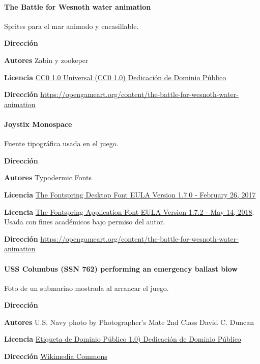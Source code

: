 \documentclass[a4paper,
	11pt,
	parskip=full,
	bibliography=totoc,
	twoside
	]{scrartcl}
\begin{document}
	\paragraph{The Battle for Wesnoth water animation}
	Sprites para el mar animado y encasillable.
	\begin{labeling}{\textbf{Dirección}}
		\item[\textbf{Autores}] Zabin y zookeper
		\item[\textbf{Licencia}] \href{https://creativecommons.org/publicdomain/zero/1.0/deed.es}{CC0 1.0 Universal (CC0 1.0)
			Dedicación de Dominio Público}
		\item[\textbf{Dirección}] \href{https://opengameart.org/content/the-battle-for-wesnoth-water-animation}{https://opengameart.org/content/the-battle-for-wesnoth-water-animation}
	\end{labeling}

	\paragraph{Joystix Monospace}
	Fuente tipográfica usada en el juego.
	\begin{labeling}{\textbf{Dirección}}
		\item[\textbf{Autores}] Typodermic Fonts
		\item[\textbf{Licencia}] \href{https://www.fontspring.com/lic/jcefupvyrh}{The Fontspring Desktop Font EULA Version 1.7.0 - February 26, 2017} 
		\item[\textbf{Licencia}] \href{https://www.fontspring.com/lic/avhl0opgxj}{The Fontspring Application Font EULA Version 1.7.2 - May 14, 2018}. Usada con fines académicos bajo permiso del autor.
		\item[\textbf{Dirección}] \href{https://opengameart.org/content/the-battle-for-wesnoth-water-animation}{https://opengameart.org/content/the-battle-for-wesnoth-water-animation}
	\end{labeling}

	\paragraph{USS Columbus (SSN 762) performing an emergency ballast blow}
	Foto de un submarino mostrada al arrancar el juego.
	\begin{labeling}{\textbf{Dirección}}
		\item[\textbf{Autores}] U.S. Navy photo by Photographer's Mate 2nd Class David C. Duncan
		\item[\textbf{Licencia}] \href{https://creativecommons.org/publicdomain/mark/1.0/deed.es_ES}{Etiqueta de Dominio Público 1.0)
			Dedicación de Dominio Público}
		\item[\textbf{Dirección}]\href{https://commons.wikimedia.org/wiki/File:980604-N-7726D-002_Submarine_Emergency_Surfacing_Drill.jpg}{Wikimedia Commons}
	\end{labeling}
\end{document}
